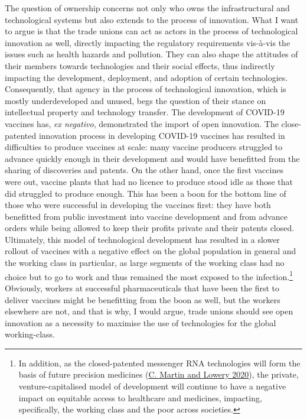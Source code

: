 \documentclass[a4paper, nobind]{templates/ociamthesis}
\begin{document}
The question of ownership concerns not only who owns the infrastructural and technological systems but also extends to the process of innovation. What I want to argue is that the trade unions can act as actors in the process of technological innovation as well, directly impacting the regulatory requirements vis-à-vis the issues such as health hazards and pollution. They can also shape the attitudes of their members towards technologies and their social effects, thus indirectly impacting the development, deployment, and adoption of certain technologies. Consequently, that agency in the process of technological innovation, which is mostly underdeveloped and unused, begs the question of their stance on intellectual property and technology transfer. The development of COVID-19 vaccines has, \emph{ex negativo}, demonstrated the import of open innovation. The close-patented innovation process in developing COVID-19 vaccines has resulted in difficulties to produce vaccines at scale: many vaccine producers struggled to advance quickly enough in their development and would have benefitted from the sharing of discoveries and patents. On the other hand, once the first vaccines were out, vaccine plants that had no licence to produce stood idle as those that did struggled to produce enough. This has been a boon for the bottom line of those who were successful in developing the vaccines first: they have both benefitted from public investment into vaccine development and from advance orders while being allowed to keep their profits private and their patents closed. Ultimately, this model of technological development has resulted in a slower rollout of vaccines with a negative effect on the global population in general and the working class in particular, as large segments of the working class had no choice but to go to work and thus remained the most exposed to the infection.\footnote{In addition, as the closed-patented messenger RNA technologies will form the basis of future precision medicines (\protect\hyperlink{ref-martin_mrna_2020}{C. Martin and Lowery 2020}), the private, venture-capitalised model of development will continue to have a negative impact on equitable access to healthcare and medicines, impacting, specifically, the working class and the poor across societies.} Obviously, workers at successful pharmaceuticals that have been the first to deliver vaccines might be benefitting from the boon as well, but the workers elsewhere are not, and that is why, I would argue, trade unions should see open innovation as a necessity to maximise the use of technologies for the global working-class.
\end{document}
